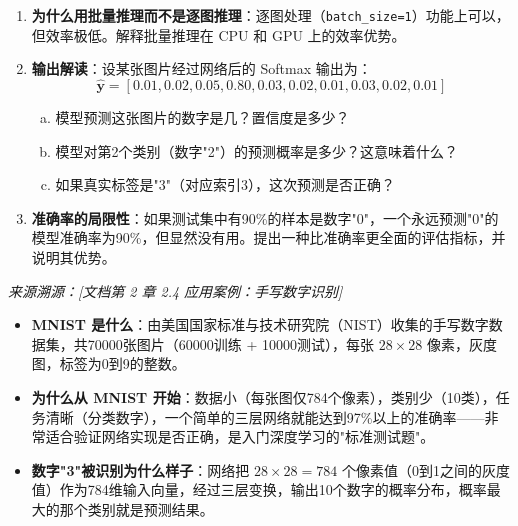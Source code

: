 \documentclass[a4paper,11pt]{ctexart}
\begin{document}
\begin{problembox}
\begin{enumerate}[(1)]
        \item \textbf{为什么用批量推理而不是逐图推理}：逐图处理（\texttt{batch\_size=1}）功能上可以，但效率极低。解释批量推理在 CPU 和 GPU 上的效率优势。

        \item \textbf{输出解读}：设某张图片经过网络后的 Softmax 输出为：
        \[
        \hat{\mathbf{y}} = [0.01, 0.02, 0.05, 0.80, 0.03, 0.02, 0.01, 0.03, 0.02, 0.01]
        \]
        \begin{enumerate}[a.]
            \item 模型预测这张图片的数字是几？置信度是多少？
            \item 模型对第2个类别（数字"2"）的预测概率是多少？这意味着什么？
            \item 如果真实标签是"3"（对应索引3），这次预测是否正确？
        \end{enumerate}

        \item \textbf{准确率的局限性}：如果测试集中有90\%的样本是数字"0"，一个永远预测"0"的模型准确率为90\%，但显然没有用。提出一种比准确率更全面的评估指标，并说明其优势。
    \end{enumerate}

    \vspace{0.2cm}
    {\color{gray}\small\textit{来源溯源：[文档第 2 章 2.4 应用案例：手写数字识别]}}
\end{problembox}

\begin{beginnerbox}
    \begin{itemize}
        \item \textbf{MNIST 是什么}：由美国国家标准与技术研究院（NIST）收集的手写数字数据集，共70000张图片（60000训练 + 10000测试），每张 $28\times28$ 像素，灰度图，标签为0到9的整数。
        \item \textbf{为什么从 MNIST 开始}：数据小（每张图仅784个像素），类别少（10类），任务清晰（分类数字），一个简单的三层网络就能达到97\%以上的准确率——非常适合验证网络实现是否正确，是入门深度学习的"标准测试题"。
        \item \textbf{数字"3"被识别为什么样子}：网络把 $28\times28=784$ 个像素值（0到1之间的灰度值）作为784维输入向量，经过三层变换，输出10个数字的概率分布，概率最大的那个类别就是预测结果。
    \end{itemize}
\end{beginnerbox}
\end{document}
